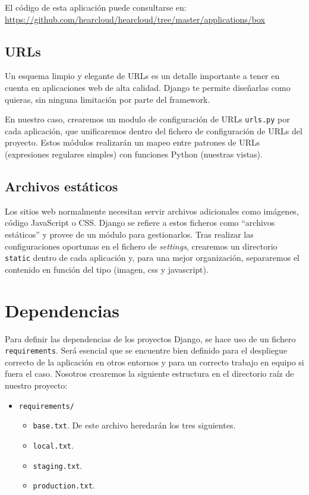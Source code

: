 El código de esta aplicación puede consultarse en: \url{https://github.com/hearcloud/hearcloud/tree/master/applications/box}

\subsection{URLs}

Un esquema limpio y elegante de URLs es un detalle importante a tener en cuenta en aplicaciones web de alta calidad. Django te permite diseñarlas como quieras, sin ninguna limitación por parte del framework. 

En nuestro caso, crearemos un modulo de configuración de URLs \texttt{urls.py} por cada aplicación, que unificaremos dentro del fichero de configuración de URLs del proyecto. Estos módulos realizarán un mapeo entre patrones de URLs (expresiones regulares simples) con funciones Python (nuestras vistas).

\subsection{Archivos estáticos}
Los sitios web normalmente necesitan servir archivos adicionales como imágenes, código JavaScript o CSS. Django se refiere a estos ficheros como ``archivos estáticos'' y provee de un módulo para gestionarlos. Tras realizar las configuraciones oportunas en el fichero de \textit{settings}, crearemos un directorio \texttt{static} dentro de cada aplicación y, para una mejor organización, separaremos el contenido en función del tipo (imagen, css y  javascript).

\section{Dependencias}

Para definir las dependencias de los proyectos Django, se hace uso de un fichero \texttt{requirements}. Será esencial que se encuentre bien definido para el despliegue correcto de la aplicación en otros entornos y para un correcto trabajo en equipo si fuera el caso. Nosotros crearemos la siguiente estructura en el directorio raíz de nuestro proyecto:

\begin{itemize}
	\item \texttt{requirements/}
	\begin{itemize}
		\item \texttt{base.txt}. De este archivo heredarán los tres siguientes.
		\item \texttt{local.txt}.
		\item \texttt{staging.txt}.
		\item \texttt{production.txt}.
	\end{itemize}
\end{itemize}

